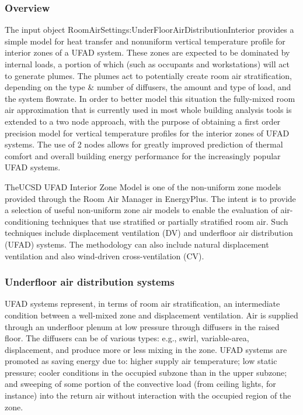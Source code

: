 \subsubsection{Overview}\label{overview-1-001}

The input object RoomAirSettings:UnderFloorAirDistributionInterior provides a simple model for heat transfer and nonuniform vertical temperature profile for interior zones of a UFAD system. These zones are expected to be dominated by internal loads, a portion of which (such as occupants and workstations) will act to generate plumes. The plumes act to potentially create room air stratification, depending on the type \& number of diffusers, the amount and type of load, and the system flowrate. In order to better model this situation the fully-mixed room air approximation that is currently used in most whole building analysis tools is extended to a two node approach, with the purpose of obtaining a first order precision model for vertical temperature profiles for the interior zones of UFAD systems. The use of 2 nodes allows for greatly improved prediction of thermal comfort and overall building energy performance for the increasingly popular UFAD systems.

TheUCSD UFAD Interior Zone Model is one of the non-uniform zone models provided through the Room Air Manager in EnergyPlus. The intent is to provide a selection of useful non-uniform zone air models to enable the evaluation of air-conditioning techniques that use stratified or partially stratified room air. Such techniques include displacement ventilation (DV) and underfloor air distribution (UFAD) systems. The methodology can also include natural displacement ventilation and also wind-driven cross-ventilation (CV).

\subsubsection{Underfloor air distribution systems}\label{underfloor-air-distribution-systems}

UFAD systems represent, in terms of room air stratification, an intermediate condition between a well-mixed zone and displacement ventilation. Air is supplied through an underfloor plenum at low pressure through diffusers in the raised floor. The diffusers can be of various types: e.g., swirl, variable-area, displacement, and produce more or less mixing in the zone. UFAD systems are promoted as saving energy due to: higher supply air temperature; low static pressure; cooler conditions in the occupied subzone than in the upper subzone; and sweeping of some portion of the convective load (from ceiling lights, for instance) into the return air without interaction with the occupied region of the zone.

